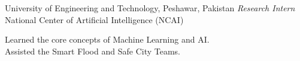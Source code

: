 \documentclass[10pt]{article}
\begin{document}
\begin{mylist}
 














    \item
    {University of Engineering and Technology, Peshawar, Pakistan}
    {\emph{Research Intern}\\
    	National Center of Artificial Intelligence (NCAI)}
    {\vspace*{-5mm}
    \begin{tabbing}
        Learned the core concepts of Machine Learning and AI. \\
        Assisted the Smart Flood and Safe City Teams. 
    \end{tabbing}}

\end{mylist}






\end{document}
